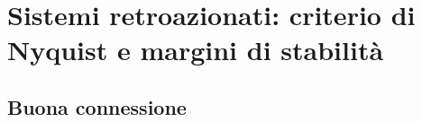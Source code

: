 \section{Sistemi retroazionati: criterio di Nyquist e margini di stabilità}

\subsection{Buona connessione}

